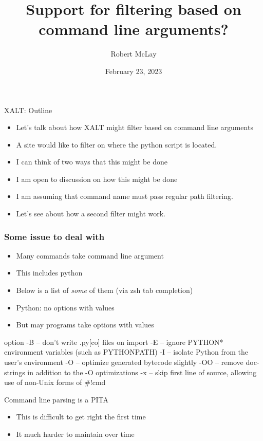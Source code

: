 \documentclass{beamer}
\begin{document}
\title[XALT]{Support for filtering based on command line arguments?}
\author{Robert McLay}
\date{February 23, 2023}

\frame{\titlepage}

\begin{frame}{XALT: Outline}
  \begin{itemize}
    \item Let's talk about how XALT might filter based on command line arguments
    \item A site would like to filter on where the python script is located.
    \item I can think of two ways that this might be done
    \item I am open to discussion on how this might be done
    \item I am assuming that command name must pass regular path
      filtering.
    \item Let's see about how a second filter might work.
      
  \end{itemize}
\end{frame}

\begin{frame}[fragile]
    \frametitle{Some issue to deal with}
  \begin{itemize}
    \item Many commands take command line argument
    \item This includes python
    \item Below is a list of \emph{some} of them (via zsh tab completion)
    \item Python: no options with values
    \item But may programs take options with values
  \end{itemize}
 {\tiny
    \begin{semiverbatim}
option
-B   -- don't write .py[co] files on import
-E   -- ignore PYTHON* environment variables (such as PYTHONPATH)
-I   -- isolate Python from the user's environment
-O   -- optimize generated bytecode slightly
-OO  -- remove doc-strings in addition to the -O optimizations
-x   -- skip first line of source, allowing use of non-Unix forms of #!cmd
    \end{semiverbatim}
}

\end{frame}

\begin{frame}{Command line parsing is a PITA}
  \begin{itemize}
    \item This is difficult to get right the first time
    \item It much harder to maintain over time
  \end{itemize}
\end{frame}
\end{document}
